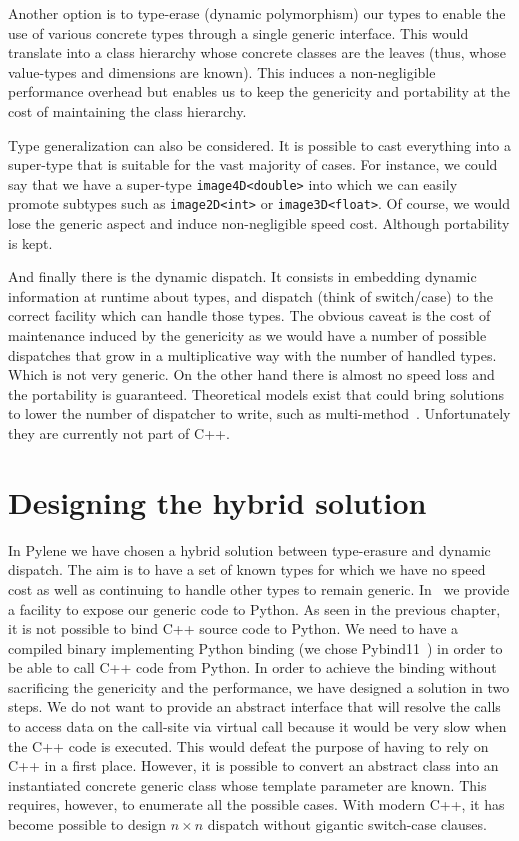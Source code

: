 Another option is to type-erase (dynamic polymorphism) our types to enable the use of various concrete types through a
single generic interface. This would translate into a class hierarchy whose concrete classes are the leaves (thus, whose
value-types and dimensions are known). This induces a non-negligible performance overhead but enables us to keep the
genericity and portability at the cost of maintaining the class hierarchy.

Type generalization can also be considered. It is possible to cast everything into a super-type that is suitable for the
vast majority of cases. For instance, we could say that we have a super-type \texttt{image4D<double>} into which we can
easily promote subtypes such as \texttt{image2D<int>} or \texttt{image3D<float>}. Of course, we would lose the generic
aspect and induce non-negligible speed cost. Although portability is kept.

And finally there is the dynamic dispatch. It consists in embedding dynamic information at runtime about types, and
dispatch (think of switch/case) to the correct facility which can handle those types. The obvious caveat is the cost of
maintenance induced by the genericity as we would have a number of possible dispatches that grow in a multiplicative way
with the number of handled types. Which is not very generic. On the other hand there is almost no speed loss and the
portability is guaranteed. Theoretical models exist that could bring solutions to lower the number of dispatcher to
write, such as multi-method~\parencite{pirkelbauer.2010.multimethods}. Unfortunately they are currently not part of C++.


\section{Designing the hybrid solution}

In Pylene we have chosen a hybrid solution between type-erasure and dynamic dispatch. The aim is to have a set of known
types for which we have no speed cost as well as continuing to handle other types to remain generic.
In~\parencite{gossec.2019.pybind} we provide a facility to expose our generic code to Python. As seen in the previous
chapter, it is not possible to bind C++ source code to Python. We need to have a compiled binary implementing Python
binding (we chose Pybind11~\parencite{jakob.2017.pybind11}) in order to be able to call C++ code from Python. In order
to achieve the binding without sacrificing the genericity and the performance, we have designed a solution in two steps.
We do not want to provide an abstract interface that will resolve the calls to access data on the call-site via virtual
call because it would be very slow when the C++ code is executed. This would defeat the purpose of having to rely on C++
in a first place. However, it is possible to convert an abstract class into an instantiated concrete generic class whose
template parameter are known. This requires, however, to enumerate all the possible cases. With modern C++, it has
become possible to design \(n \times n\) dispatch without gigantic switch-case clauses.



